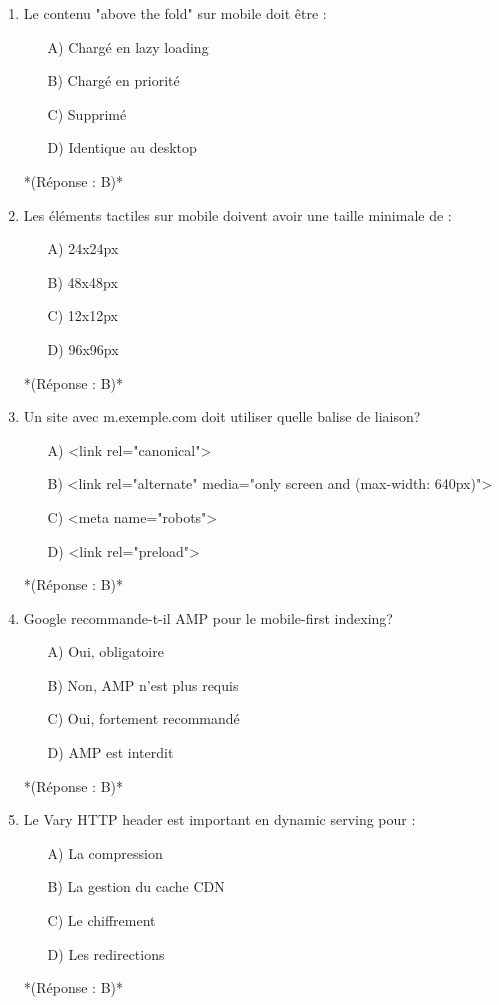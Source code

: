 \documentclass[12pt,a4paper,twoside]{report}
\begin{document}
\begin{enumerate}
\item Le contenu "above the fold" sur mobile doit être :
\begin{itemize}
\item[A)] Chargé en lazy loading
\item[B)] Chargé en priorité
\item[C)] Supprimé
\item[D)] Identique au desktop
\end{itemize}
*(Réponse : B)*

\item Les éléments tactiles sur mobile doivent avoir une taille minimale de :
\begin{itemize}
\item[A)] 24x24px
\item[B)] 48x48px
\item[C)] 12x12px
\item[D)] 96x96px
\end{itemize}
*(Réponse : B)*

\item Un site avec m.exemple.com doit utiliser quelle balise de liaison?
\begin{itemize}
\item[A)] <link rel="canonical">
\item[B)] <link rel="alternate" media="only screen and (max-width: 640px)">
\item[C)] <meta name="robots">
\item[D)] <link rel="preload">
\end{itemize}
*(Réponse : B)*

\item Google recommande-t-il AMP pour le mobile-first indexing?
\begin{itemize}
\item[A)] Oui, obligatoire
\item[B)] Non, AMP n'est plus requis
\item[C)] Oui, fortement recommandé
\item[D)] AMP est interdit
\end{itemize}
*(Réponse : B)*

\item Le Vary HTTP header est important en dynamic serving pour :
\begin{itemize}
\item[A)] La compression
\item[B)] La gestion du cache CDN
\item[C)] Le chiffrement
\item[D)] Les redirections
\end{itemize}
*(Réponse : B)*


\end{enumerate}
\end{document}

